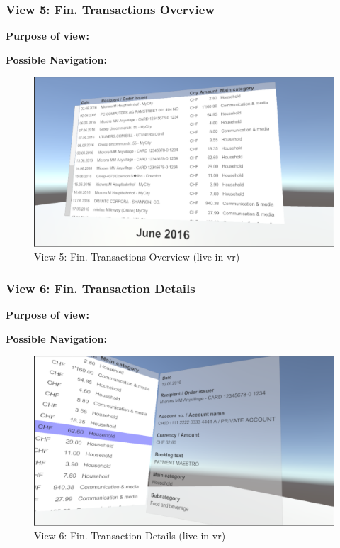 \subsubsection{View 5: Fin. Transactions Overview}

\textbf{Purpose of view:}


\textbf{Possible Navigation:}

\begin{figure}[h]
	\begin{center}
		\includegraphics[width=14cm]{03_Figures/08_Development/View5_FinTransactionsOverview.png}
		\caption{View 5: Fin. Transactions Overview (live in \gls{vr})}
		\label{fig:unityview5}
	\end{center}
\end{figure}


\subsubsection{View 6: Fin. Transaction Details}

\textbf{Purpose of view:}


\textbf{Possible Navigation:}

\begin{figure}[h]
	\begin{center}
		\includegraphics[width=14cm]{03_Figures/08_Development/View6_FinTransactionDetails.png}
		\caption{View 6: Fin. Transaction Details (live in \gls{vr})}
		\label{fig:unityview6}
	\end{center}
\end{figure}



